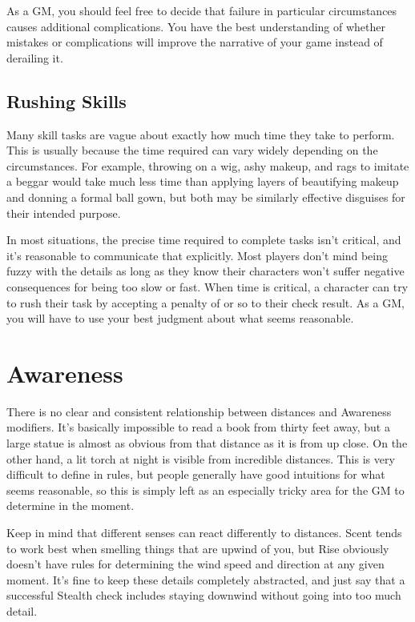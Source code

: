     As a GM, you should feel free to decide that failure in particular circumstances causes additional complications.
    You have the best understanding of whether mistakes or complications will improve the narrative of your game instead of derailing it.

  \subsection{Rushing Skills}
    Many skill tasks are vague about exactly how much time they take to perform.
    This is usually because the time required can vary widely depending on the circumstances.
    For example, throwing on a wig, ashy makeup, and rags to imitate a beggar would take much less time than applying layers of beautifying makeup and donning a formal ball gown, but both may be similarly effective disguises for their intended purpose.

    In most situations, the precise time required to complete tasks isn't critical, and it's reasonable to communicate that explicitly.
    Most players don't mind being fuzzy with the details as long as they know their characters won't suffer negative consequences for being too slow or fast.
    When time is critical, a character can try to rush their task by accepting a penalty of  or so to their check result.
    As a GM, you will have to use your best judgment about what seems reasonable.

\section{Awareness}
    There is no clear and consistent relationship between distances and Awareness modifiers.
    It's basically impossible to read a book from thirty feet away, but a large statue is almost as obvious from that distance as it is from up close.
    On the other hand, a lit torch at night is visible from incredible distances.
    This is very difficult to define in rules, but people generally have good intuitions for what seems reasonable, so this is simply left as an especially tricky area for the GM to determine in the moment.

    Keep in mind that different senses can react differently to distances.
    Scent tends to work best when smelling things that are upwind of you, but Rise obviously doesn't have rules for determining the wind speed and direction at any given moment.
    It's fine to keep these details completely abstracted, and just say that a successful Stealth check includes staying downwind without going into too much detail.


